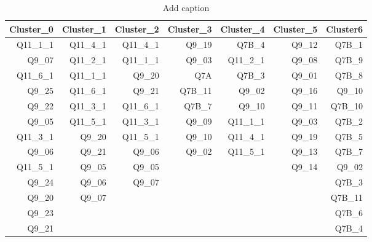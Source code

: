 \documentclass{article}
\begin{document}
\begin{table}[htbp]
  \centering
  \caption{Add caption}
    \begin{tabular}{rrrrrrr}
    \toprule
    Cluster\_0 & Cluster\_1 & Cluster\_2 & Cluster\_3 & Cluster\_4 & Cluster\_5 & Cluster6 \\
    \midrule
    Q11\_1\_1 & Q11\_4\_1 & Q11\_4\_1 & Q9\_19 & Q7B\_4 & Q9\_12 & Q7B\_1 \\
    Q9\_07 & Q11\_2\_1 & Q11\_1\_1 & Q9\_03 & Q11\_2\_1 & Q9\_08 & Q7B\_9 \\
    Q11\_6\_1 & Q11\_1\_1 & Q9\_20 & Q7A   & Q7B\_3 & Q9\_01 & Q7B\_8 \\
    Q9\_25 & Q11\_6\_1 & Q9\_21 & Q7B\_11 & Q9\_02 & Q9\_16 & Q9\_10 \\
    Q9\_22 & Q11\_3\_1 & Q11\_6\_1 & Q7B\_7 & Q9\_10 & Q9\_11 & Q7B\_10 \\
    Q9\_05 & Q11\_5\_1 & Q11\_3\_1 & Q9\_09 & Q11\_1\_1 & Q9\_03 & Q7B\_2 \\
    Q11\_3\_1 & Q9\_20 & Q11\_5\_1 & Q9\_10 & Q11\_4\_1 & Q9\_19 & Q7B\_5 \\
    Q9\_06 & Q9\_21 & Q9\_06 & Q9\_02 & Q11\_5\_1 & Q9\_13 & Q7B\_7 \\
    Q11\_5\_1 & Q9\_05 & Q9\_05 &       &       & Q9\_14 & Q9\_02 \\
    Q9\_24 & Q9\_06 & Q9\_07 &       &       &       & Q7B\_3 \\
    Q9\_20 & Q9\_07 &       &       &       &       & Q7B\_11 \\
    Q9\_23 &       &       &       &       &       & Q7B\_6 \\
    Q9\_21 &       &       &       &       &       & Q7B\_4 \\
    \bottomrule
    \end{tabular}
  \label{tab:addlabel}
\end{table}
\end{document}
